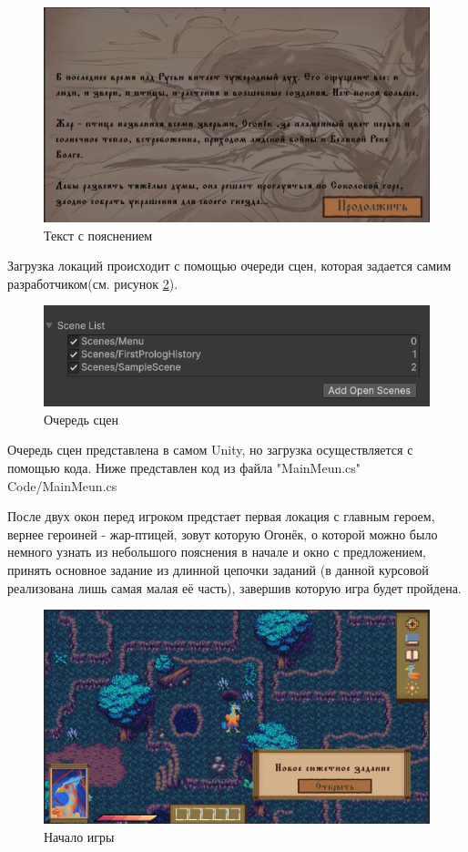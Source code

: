 \documentclass[bachelor, och, coursework, times]{SCWorks}
\begin{document}
       \begin{figure} [H]
        \centering
    \includegraphics[width=0.50\linewidth]{Pictures/Снимок экрана 2025-06-24 211041.png}
    \caption{Текст с пояснением}
    \label{fig:Descript}
    \end{figure}


    Загрузка локаций происходит с помощью очереди сцен, которая задается 
    самим разработчиком(см. рисунок \ref{fig:Scene}).
    
     \begin{figure} [H]
        \centering
    \includegraphics[width=0.50\linewidth]{Pictures/Снимок экрана 2025-06-24 203012.png}
    \caption{Очередь сцен}
    \label{fig:Scene}
    \end{figure}
    
    
    Очередь сцен представлена в самом Unity, но загрузка
    осуществляется с помощью кода. Ниже представлен код из файла "MainMeun.cs"
     {Code/MainMeun.cs}

    После двух окон перед игроком предстает первая локация с главным героем, вернее
    героиней - жар-птицей, зовут которую Огонёк, о которой можно было немного узнать из небольшого пояснения в начале и окно с предложением,
    принять основное задание из длинной цепочки заданий (в данной курсовой реализована лишь самая малая её часть),
     завершив которую игра будет пройдена. 

     \begin{figure} [H]
        \centering
    \includegraphics[width=0.50\linewidth]{Pictures/Снимок экрана 2025-06-24 212326.png}
    \caption{Начало игры}
    \label{fig:BeginningGame}
    \end{figure}
\end{document}
